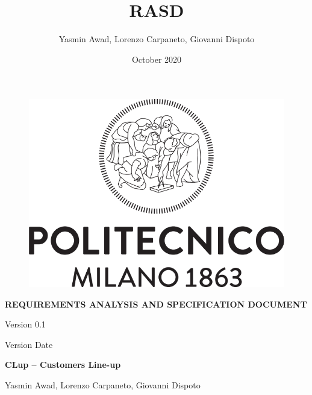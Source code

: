\documentclass[a4paper, 10pt, oneside]{article}
\title{RASD}
\author{Yasmin Awad, Lorenzo Carpaneto, Giovanni Dispoto}
\date{October 2020}
\begin{document}
\begin{titlepage}
\vspace*{\fill}
\begin{figure}[h!]
	\centering
	\includegraphics[scale=0.5]{img/logopoli.png}
\end{figure}
\vspace{0.7em}
\begin{center}
	\Large \textbf{REQUIREMENTS ANALYSIS AND SPECIFICATION DOCUMENT}
\end{center}
\begin{center}
	\large Version 0.1
\end{center}
\begin{center}
	\large Version Date
\end{center}
\vspace{0.4em}
\begin{center}
	\Large \textbf{CLup – Customers Line-up } 
\end{center}
\vspace{-0.6em}
\begin{center}
	\normalsize Yasmin Awad, Lorenzo Carpaneto, Giovanni Dispoto
\end{center}
\vspace*{\fill}
\end{titlepage}

\normalsize


\newpage
\tableofcontents
\newpage
\end{document}
